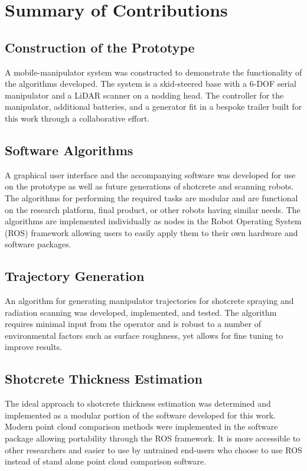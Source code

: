 \section{Summary of Contributions}
\label{sec:contributions}

\subsection{Construction of the Prototype}
A mobile-manipulator system was constructed to demonstrate the functionality of the algorithms developed. The system is a skid-steered base with a 6-DOF serial manipulator and a LiDAR scanner on a nodding head. The controller for the manipulator, additional batteries, and a generator fit in a bespoke trailer built for this work through a collaborative effort.\\

\subsection{Software Algorithms}
A graphical user interface and the accompanying software was developed for use on the prototype as well as future generations of shotcrete and scanning robots. The algorithms for performing the required tasks are modular and are functional on the research platform, final product, or other robots having similar needs. The algorithms are implemented individually as nodes in the Robot Operating System (ROS) framework allowing users to easily apply them to their own hardware and software packages.\\

\subsection{Trajectory Generation}
An algorithm for generating manipulator trajectories for shotcrete spraying and radiation scanning was developed, implemented, and tested. The algorithm requires minimal input from the operator and is robust to a number of environmental factors such as surface roughness, yet allows for fine tuning to improve results.\\

\subsection{Shotcrete Thickness Estimation}
The ideal approach to shotcrete thickness estimation was determined and implemented as a modular portion of the software developed for this work. Modern point cloud comparison methods were implemented in the software package allowing portability through the ROS framework. It is more accessible to other researchers and easier to use by untrained end-users who choose to use ROS instead of stand alone point cloud comparison software.

